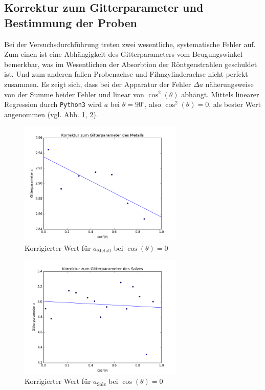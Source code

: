 \subsection{Korrektur zum Gitterparameter und Bestimmung der Proben}
Bei der Versuchsdurchführung treten zwei wesentliche, systematische Fehler auf. Zum einen ist eine Abhängigkeit des Gitterparameters vom Beugungswinkel
bemerkbar,
was im Wesentlichen der Absorbtion der Röntgenstrahlen geschuldet ist. Und zum anderen fallen Probenachse und Filmzylinderachse nicht perfekt zusammen.
Es zeigt sich, dass bei der Apparatur der Fehler $\Delta a$ näherungsweise von der Summe beider Fehler und linear von $\cos^2(\theta)$ abhängt. Mittels
linearer Regression durch \texttt{Python3} wird $a$ bei $\theta = 90^\circ$, also $\cos^2(\theta)=0$, als bester Wert angenommen (vgl. Abb. \ref{pic:fita1}, \ref{pic:fita2}). 


\begin{figure}[H]
	\includegraphics[width=0.7\textwidth]{../pics/a1.png}
	\caption{Korrigierter Wert für $a_\text{Metall}$ bei $\cos(\theta)=0$}
	\label{pic:fita1}
\end{figure}

\begin{figure}[H]
	\includegraphics[width=0.7\textwidth]{../pics/a2.png}
	\caption{Korrigierter Wert für $a_\text{Salz}$ bei $\cos(\theta)=0$}
	\label{pic:fita2}
\end{figure}

